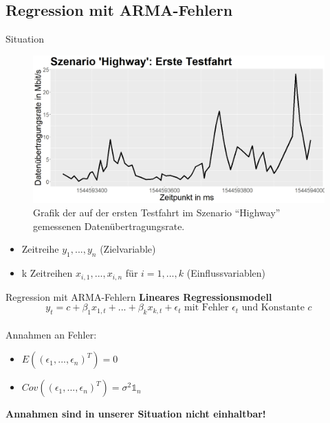 \subsection{Regression mit ARMA-Fehlern}
\nocite{forecasting}

\begin{frame}{Situation}
	\begin{figure}[]
		\includegraphics[scale=0.25]{highway_drive_one}
		\caption{Grafik der auf der ersten Testfahrt im Szenario ``Highway'' gemessenen Datenübertragungsrate.}
		\label{highway_drive_one}
	\end{figure}
	
	\begin{itemize}
		\item Zeitreihe $y_1,...,y_n$ (Zielvariable)
		\item k Zeitreihen $x_{i,1},...,x_{i,n}$ für $i=1,...,k$ (Einflussvariablen)
	\end{itemize}
\end{frame}

\begin{frame}{Regression mit ARMA-Fehlern}
	\textbf{Lineares Regressionsmodell} \\
	$$y_{t} = c + \beta_1 x_{1,t} + ... + \beta_k x_{k,t} + \epsilon_t \text{ mit Fehler } \epsilon_t \text{ und Konstante }c$$ \\
	Annahmen an Fehler:
	\begin{itemize}
		\item $E((\epsilon_1,...,\epsilon_n)^T) = 0$
		\item $Cov((\epsilon_1,...,\epsilon_n)^T)=\sigma^2 \mathds{1}_n$
	\end{itemize}
	\textbf{Annahmen sind in unserer Situation nicht einhaltbar!}
\end{frame}


